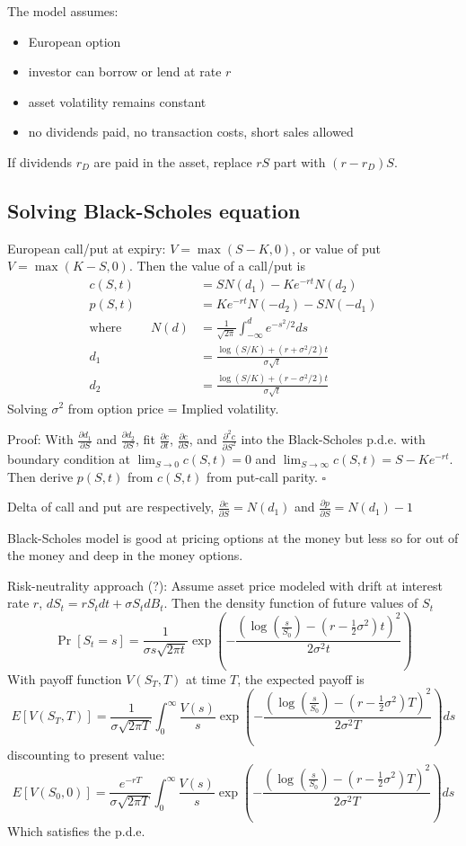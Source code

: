 \documentclass[9pt,twocolumn]{extarticle}
\begin{document}
The model assumes:
\begin{itemize}
\item European option
\item investor can borrow or lend at rate $r$
\item asset volatility remains constant
\item no dividends paid, no transaction costs, short sales allowed
\end{itemize}
If dividends $r_D$ are paid in the asset, replace $rS$ part with $(r-r_D)S$.

\subsection*{Solving Black-Scholes equation}

European call/put at expiry: $V = \max(S-K,0)$, or value of put $V=\max(K-S, 0)$.
Then the value of a call/put is
\begin{align*}
c(S,t) &= SN(d_1) - Ke^{-rt}N(d_2) \\
p(S,t) &= Ke^{-rt}N(-d_2) - SN(-d_1) \\
\text{where }\qquad
N(d) &= \frac{1}{\sqrt{2\pi}}\int_{-\infty}^d e^{-s^2/2} ds \\
d_1 &= \frac{\log(S/K)+(r+\sigma^2/2)t}{\sigma\sqrt{t}} \\
d_2 &= \frac{\log(S/K)+(r-\sigma^2/2)t}{\sigma\sqrt{t}}
\end{align*}
Solving $\sigma^2$ from option price = Implied volatility.

Proof: With $\frac{\partial d_1}{\partial S}$ and $\frac{\partial d_2}{\partial
S}$, fit $\frac{\partial c}{\partial t}$, $\frac{\partial c}{\partial S}$, and
$\frac{\partial^2 c}{\partial S^2}$ into the Black-Scholes p.d.e. with boundary
condition at $\lim_{S\to 0} c(S,t) = 0$ and
$\lim_{S\to\infty} c(S,t) = S - Ke^{-rt}$. Then derive $p(S,t)$ from $c(S,t)$
from put-call parity. $\square$

Delta of call and put are respectively, $\frac{\partial c}{\partial S} = N(d_1)$
and $\frac{\partial p}{\partial S} = N(d_1) - 1$

Black-Scholes model is good at pricing options at the money but less so for out
of the money and deep in the money options.

Risk-neutrality approach (?): Assume asset price modeled with drift at interest rate $r$,
$dS_t = rS_t dt + \sigma S_t dB_t$. Then the density function of future values of $S_t$
$$ \Pr[S_t = s] = \frac{1}{\sigma s \sqrt{2\pi t}} \exp\left(-\frac{\left(\log(\frac{s}{S_0}) - (r-\frac{1}{2}\sigma^2)t\right)^2}{2\sigma^2t}\right)$$
With payoff function $V(S_T,T)$ at time $T$, the expected payoff is
$$ E[V(S_T,T)] = \frac{1}{\sigma \sqrt{2\pi T}} \int_0^{\infty} \frac{V(s)}{s} \exp\left(-\frac{\left(\log(\frac{s}{S_0}) - (r-\frac{1}{2}\sigma^2)T\right)^2}{2\sigma^2T}\right) ds $$
discounting to present value:
$$ E[V(S_0,0)] = \frac{e^{-rT}}{\sigma \sqrt{2\pi T}} \int_0^{\infty} \frac{V(s)}{s} \exp\left(-\frac{\left(\log(\frac{s}{S_0}) - (r-\frac{1}{2}\sigma^2)T\right)^2}{2\sigma^2T}\right) ds $$
Which satisfies the p.d.e.
\end{document}
